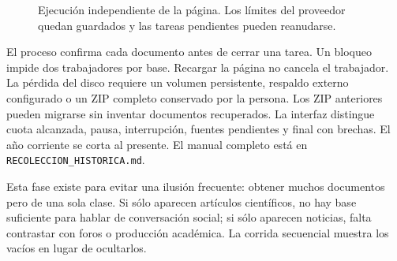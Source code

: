 \documentclass[11pt]{article}
\begin{document}
\begin{figure}[ht]
\centering
{}
\caption{Ejecución independiente de la página. Los límites del proveedor quedan guardados y las tareas pendientes pueden reanudarse.}
\end{figure}

El proceso confirma cada documento antes de cerrar una tarea. Un bloqueo impide
dos trabajadores por base. Recargar la página no cancela el trabajador. La pérdida
del disco requiere un volumen persistente, respaldo externo configurado o un ZIP
completo conservado por la persona. Los ZIP anteriores pueden migrarse sin
inventar documentos recuperados. La interfaz distingue cuota alcanzada, pausa,
interrupción, fuentes pendientes y final con brechas. El año corriente se corta
al presente. El manual completo está en \texttt{RECOLECCION\_HISTORICA.md}.

Esta fase existe para evitar una ilusión frecuente: obtener muchos documentos
pero de una sola clase. Si sólo aparecen artículos científicos, no hay base
suficiente para hablar de conversación social; si sólo aparecen noticias, falta
contrastar con foros o producción académica. La corrida secuencial muestra los
vacíos en lugar de ocultarlos.
\end{document}
